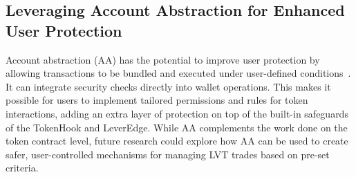 \subsection{Leveraging Account Abstraction for Enhanced User Protection}
Account abstraction (AA) has the potential to improve user protection by allowing transactions to be bundled and executed under user-defined conditions~\cite{Ethereum_AA}. It can integrate security checks directly into wallet operations. This makes it possible for users to implement tailored permissions and rules for token interactions, adding an extra layer of protection on top of the built-in safeguards of the TokenHook and LeverEdge. While AA complements the work done on the token contract level, future research could explore how AA can be used to create safer, user-controlled mechanisms for managing LVT trades based on pre-set criteria.